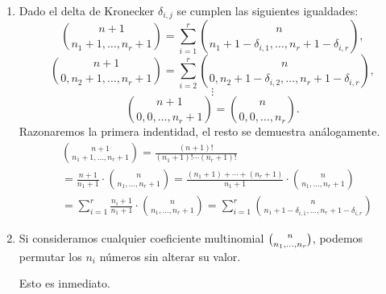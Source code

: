 \documentclass{article}
\theoremstyle{plain}
\theoremstyle{definition}
\begin{document}
\begin{enumerate}
    \item Dado el delta de Kronecker $\delta_{i, j}$ se cumplen las siguientes igualdades:
    \[
    \binom{n+1}{n_1 + 1, \dots, n_r + 1}
    =
    \sum_{i=1}^r \binom{n}{n_1 + 1 - \delta_{i, 1}, \dots, n_r + 1 - \delta_{i, r}},
    \]
    \[
    \binom{n+1}{0, n_2 + 1, \dots, n_r + 1}
    =
    \sum_{i=2}^r \binom{n}{0, n_2 + 1 - \delta_{i, 2}, \dots, n_r + 1 - \delta_{i, r}},
    \]
    \[
    \vdots
    \]
    \[
    \binom{n+1}{0, 0, \dots, n_r + 1}
    =
    \binom{n}{0, 0, \dots, n_r}.
    \]
    Razonaremos la primera indentidad, el resto se demuestra análogamente.
    \begin{align*}
        &\binom{n+1}{n_1 + 1, \dots, n_r + 1}
        =
        \frac{(n+1)!}{(n_1 + 1)!\cdots(n_r + 1)!} \\
        &=
        \frac{n+1}{n_1 + 1}
        \cdot
        \binom{n}{n_1, \dots, n_r + 1}
        =
        \frac{(n_1 + 1) + \cdots + (n_r + 1)}{n_1 + 1}
        \cdot
        \binom{n}{n_1, \dots, n_r + 1} \\
        &=
        \sum_{i=1}^{r}\frac{n_i + 1}{n_1 + 1} \cdot \binom{n}{n_1, \dots, n_r + 1}
        =
        \sum_{i=1}^r \binom{n}{n_1 + 1 - \delta_{i, 1}, \dots, n_r + 1 - \delta_{i, r}}
    \end{align*}
    \item Si consideramos cualquier coeficiente multinomial $\tbinom{n}{n_1, \dots, n_r}$,
    podemos permutar los $n_i$ números sin alterar su valor.

    Esto es inmediato.
\end{enumerate}
\end{document}
